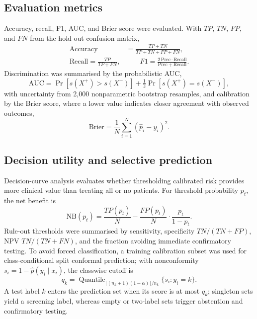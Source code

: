 \documentclass[conference]{IEEEtran}
\begin{document}
\subsection{Evaluation metrics}

Accuracy, recall, F1, AUC, and Brier score were evaluated. With $TP$, $TN$,
$FP$, and $FN$ from the hold-out confusion matrix,
\begin{equation}
\begin{aligned}
\mathrm{Accuracy}&=\frac{TP+TN}{TP+TN+FP+FN},\\
\mathrm{Recall}=\frac{TP}{TP+FN},&\qquad
F1=\frac{2\,\mathrm{Prec}\cdot\mathrm{Recall}}{\mathrm{Prec}+\mathrm{Recall}}.
\end{aligned}
\label{eq:metrics}
\end{equation}
Discrimination was summarised by the probabilistic AUC,
\begin{equation}
\mathrm{AUC}=\Pr\!\left[s(X^{+})>s(X^{-})\right]+\tfrac{1}{2}
\Pr\!\left[s(X^{+})=s(X^{-})\right],
\label{eq:auc}
\end{equation}
with uncertainty from 2{,}000 nonparametric bootstrap resamples, and calibration
by the Brier score, where a lower value indicates closer agreement with observed
outcomes,
\begin{equation}
\mathrm{Brier}=\frac{1}{N}\sum_{i=1}^{N}(\hat p_i-y_i)^2.
\label{eq:brier}
\end{equation}

\subsection{Decision utility and selective prediction}

Decision-curve analysis evaluates whether thresholding calibrated risk provides
more clinical value than treating all or no patients. For threshold probability
$p_t$, the net benefit is
\begin{equation}
\mathrm{NB}(p_t)=\frac{TP(p_t)}{N}-\frac{FP(p_t)}{N}\cdot\frac{p_t}{1-p_t}.
\label{eq:nb}
\end{equation}
Rule-out thresholds were summarised by sensitivity, specificity $TN/(TN+FP)$,
NPV $TN/(TN+FN)$, and the fraction avoiding immediate confirmatory testing. To
avoid forced classification, a training calibration subset was used for
class-conditional split conformal prediction; with nonconformity
$s_i=1-\hat p(y_i\mid x_i)$, the classwise cutoff is
\begin{equation}
q_k=\operatorname{Quantile}_{\lceil(n_k+1)(1-\alpha)\rceil/n_k}
\{s_i:y_i=k\}.
\label{eq:conformal}
\end{equation}
A test label $k$ enters the prediction set when its score is at most $q_k$;
singleton sets yield a screening label, whereas empty or two-label sets trigger
abstention and confirmatory testing.
\end{document}
